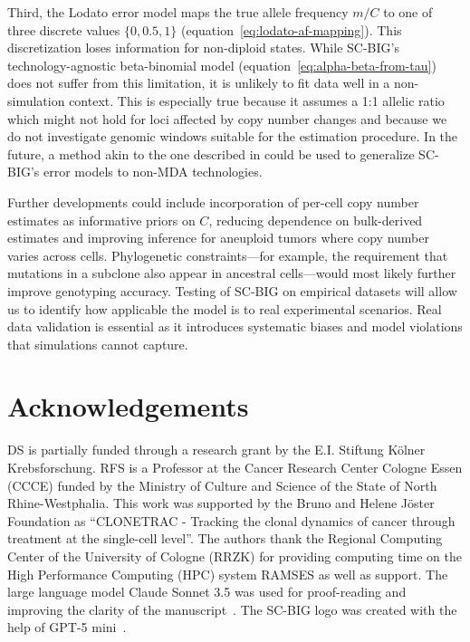 \documentclass[10pt]{article}
\begin{document}
Third, the Lodato error model maps the true allele frequency $m/C$ to one of three discrete values $\{0, 0.5, 1\}$ (equation~\eqref{eq:lodato-af-mapping}).
This discretization loses information for non-diploid states.
While SC-BIG's technology-agnostic beta-binomial model (equation~\eqref{eq:alpha-beta-from-tau}) does not suffer from this limitation, it is unlikely to fit data well in a non-simulation context.
This is especially true because it assumes a 1:1 allelic ratio which might not hold for loci affected by copy number changes and because we do not investigate genomic windows suitable for the estimation procedure.
In the future, a method akin to the one described in \textcite{luquette2019} could be used to generalize SC-BIG's error models to non-MDA technologies.

Further developments could include incorporation of per-cell copy number estimates as informative priors on $C$, reducing dependence on bulk-derived estimates and improving inference for aneuploid tumors where copy number varies across cells.
Phylogenetic constraints---for example, the requirement that mutations in a subclone also appear in ancestral cells---would most likely further improve genotyping accuracy.
Testing of SC-BIG on empirical datasets will allow us to identify how applicable the model is to real experimental scenarios.
Real data validation is essential as it introduces systematic biases and model violations that simulations cannot capture.

\section{Acknowledgements}

\noindent DS is partially funded through a research grant by the E.I. Stiftung Kölner Krebsforschung.
RFS is a Professor at the Cancer Research Center Cologne Essen (CCCE) funded by the Ministry of Culture and Science of the State of North Rhine-Westphalia.
This work was supported by the Bruno and Helene Jöster Foundation as ``CLONETRAC - Tracking the clonal dynamics of cancer through treatment at the single-cell level''.
The authors thank the Regional Computing Center of the University of Cologne (RRZK) for providing computing time on the High Performance Computing (HPC) system RAMSES as well as support.
The large language model Claude Sonnet 3.5 was used for proof-reading and improving the clarity of the manuscript~\cite{claude3_2024}.
The SC-BIG logo was created with the help of GPT-5 mini~\cite{gpt5mini_2026}.
\end{document}
